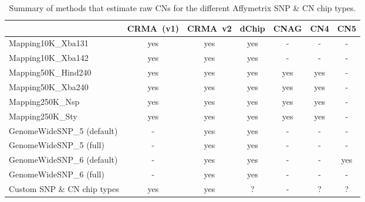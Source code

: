\documentclass[10pt,a4paper]{article}
\begin{document}

\begin{table}[hp]
\begin{center}
\begin{tabular}{|l|cc|c|c|cc|}
\hline
                             & CRMA~(v1) & CRMA~v2 & dChip & CNAG & CN4 & CN5 \\
\hline
\hline
Mapping10K\_Xba131           & yes     & yes       & yes   &    - &   - &  -  \\
Mapping10K\_Xba142           & yes     & yes       & yes   &    - &   - &  -  \\
\hline
Mapping50K\_Hind240          & yes     & yes       & yes   &  yes & yes &  -  \\
Mapping50K\_Xba240           & yes     & yes       & yes   &  yes & yes &  -  \\
\hline
Mapping250K\_Nsp             & yes     & yes       & yes   &  yes & yes &  -  \\
Mapping250K\_Sty             & yes     & yes       & yes   &  yes & yes &  -  \\
\hline
GenomeWideSNP\_5 (default)   &  -      & yes       & yes   &    - &  -  &  -  \\
GenomeWideSNP\_5 (full)      &  -      & yes       & yes   &    - &  -  &  -  \\
\hline
GenomeWideSNP\_6 (default)   &  -      & yes       & yes   &    - &  -  & yes \\
GenomeWideSNP\_6 (full)      &  -      & yes       & yes   &    - &  -  &  -  \\
\hline
Custom SNP \& CN chip types  &  yes    & yes       &   ?   &    - &  ?  &  ?  \\
\hline
\end{tabular}
\end{center}
\caption{Summary of methods that estimate raw CNs for the different Affymetrix SNP \& CN chip types.}
\label{tblSummaryOfMethods}
\end{table}



\clearpage
\end{document}
